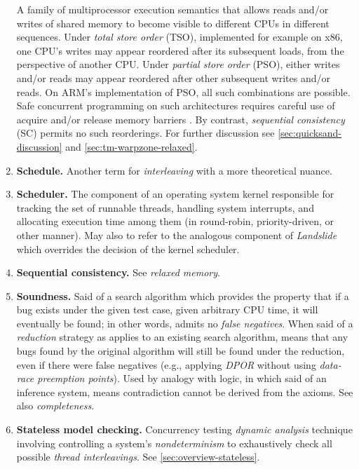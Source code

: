 \begin{enumerate}
{		A family of multiprocessor execution semantics
		that allows reads and/or writes of shared memory to become visible to different CPUs in different sequences.
		Under {\em total store order} (TSO),
		implemented for example on x86,
		one CPU's writes may appear reordered after its subsequent loads, from the perspective of another CPU.
		Under {\em partial store order} (PSO),
		either writes and/or reads may appear reordered after other subsequent writes and/or reads.
		On ARM's implementation of PSO, all such combinations are possible.
		Safe concurrent programming on such architectures requires careful use
		of acquire and/or release memory barriers
		\cite{sully-thesis}.
		By contrast, {\em sequential consistency} (SC) permits no such reorderings.
		For further discussion see \cref{sec:quicksand-discussion} and \cref{sec:tm-warpzone-relaxed}.}
	\item {\bf Schedule.}
		Another term for {\em interleaving} with a more theoretical nuance.
	\item {\bf Scheduler.}
		The component of an operating system kernel responsible for tracking the set of runnable threads,
		handling system interrupts,
		and allocating execution time among them (in round-robin, priority-driven, or other manner).
		May also to refer to the analogous component of {\em Landslide}
		which overrides the decision of the kernel scheduler.
	\item {\bf Sequential consistency.} See {\em relaxed memory}.
	\item {\bf Soundness.}
		Said of a search algorithm
		which provides the property that if a bug exists under the given test case,
		given arbitrary CPU time,
		it will eventually be found;
		in other words, admits no {\em false negatives}.
		When said of a {\em reduction} strategy as applies to an existing search algorithm,
		means that any bugs found by the original algorithm will still be found under the reduction,
		even if there were false negatives
		(e.g., applying {\em DPOR} without using {\em data-race preemption points}).
		Used by analogy with logic, in which said of an inference system,
		means contradiction cannot be derived from the axioms.
		See also {\em completeness}.
	\item {\bf Stateless model checking.}
		Concurrency testing {\em dynamic analysis} technique involving controlling a system's {\em nondeterminism}
		to exhaustively check all possible {\em thread interleavings}.
		See \cref{sec:overview-stateless}.

\end{enumerate}
